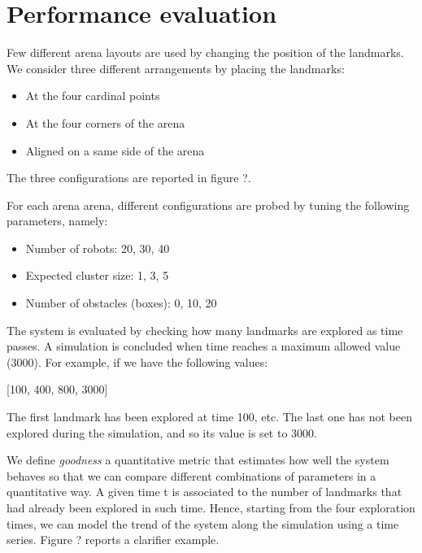 \chapter{Performance evaluation}

\bigskip
Few different arena layouts are used by changing the position of the landmarks. We consider three different arrangements by placing the landmarks:

\begin{itemize}

  \item At the four cardinal points
  \item At the four corners of the arena
  \item Aligned on a same side of the arena

\end{itemize}

The three configurations are reported in figure ?. 

\smallskip
For each arena arena, different configurations are probed by tuning the following parameters, namely:

\begin{itemize}

  \item Number of robots: 20, 30, 40
  \item Expected cluster size: 1, 3, 5
  \item Number of obstacles (boxes): 0, 10, 20

\end{itemize}

The system is evaluated by checking how many landmarks are explored as time passes. A simulation is concluded when time reaches a maximum allowed value (3000). For example, if we have the following values:

\begin{center}
[100, 400, 800, 3000]
\end{center}

The first landmark has been explored at time 100, etc. The last one has not been explored during the simulation, and so its value is set to 3000.

\noindent
We define \textit{goodness} a quantitative metric that estimates how well the system behaves so that we can compare different combinations of parameters in a quantitative way. A given time t is associated to the number of landmarks that had already been explored in such time. Hence, starting from the four exploration times, we can model the trend of the system along the simulation using a time series. Figure ? reports a clarifier example.  



